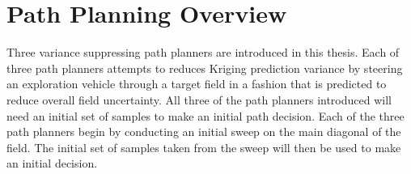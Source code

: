 






\section{Path Planning Overview}
Three variance suppressing path planners are introduced in this thesis. Each of three path planners attempts to reduces Kriging prediction variance by steering an exploration vehicle through a target field in a fashion that is predicted to reduce overall field uncertainty. All three of the path planners introduced will need an initial set of samples to make an initial path decision. Each of the three path planners begin by conducting an initial sweep on the main diagonal of the field. The initial set of samples taken from the sweep will then be used to make an initial decision.

